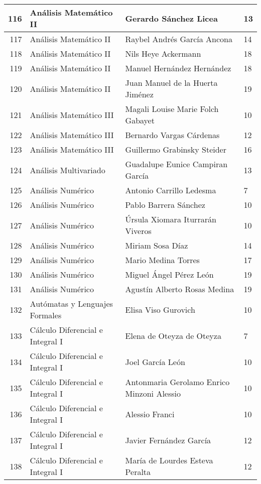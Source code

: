 \begin{table}[ht]
\begin{tabular}{rlll}
  116 & Análisis Matemático II & Gerardo Sánchez Licea & 13 \\ \hline
  117 & Análisis Matemático II & Raybel Andrés García Ancona & 14 \\ \hline
  118 & Análisis Matemático II & Nils Heye Ackermann & 18 \\ \hline
  119 & Análisis Matemático II & Manuel Hernández Hernández & 18 \\ \hline
  120 & Análisis Matemático II & Juan Manuel de la Huerta Jiménez & 19 \\ \hline
  121 & Análisis Matemático III & Magali Louise Marie Folch Gabayet & 10 \\ \hline
  122 & Análisis Matemático III & Bernardo Vargas Cárdenas & 12 \\ \hline
  123 & Análisis Matemático III & Guillermo Grabinsky Steider & 16 \\ \hline
  124 & Análisis Multivariado & Guadalupe Eunice Campiran García & 13 \\ \hline
  125 & Análisis Numérico & Antonio Carrillo Ledesma & 7 \\ \hline
  126 & Análisis Numérico & Pablo Barrera Sánchez & 10 \\ \hline
  127 & Análisis Numérico & Úrsula Xiomara Iturrarán Viveros & 10 \\ \hline
  128 & Análisis Numérico & Miriam Sosa Díaz & 14 \\ \hline
  129 & Análisis Numérico & Mario Medina Torres & 17 \\ \hline
  130 & Análisis Numérico & Miguel Ángel Pérez León & 19 \\ \hline
  131 & Análisis Numérico & Agustín Alberto Rosas Medina & 19 \\ \hline
  132 & Autómatas y Lenguajes Formales & Elisa Viso Gurovich & 10 \\ \hline
  133 & Cálculo Diferencial e Integral I & Elena de Oteyza de Oteyza & 7 \\ \hline
  134 & Cálculo Diferencial e Integral I & Joel García León & 10 \\ \hline
  135 & Cálculo Diferencial e Integral I & Antonmaria Gerolamo Enrico Minzoni Alessio & 10 \\ \hline
  136 & Cálculo Diferencial e Integral I & Alessio Franci & 10 \\ \hline
  137 & Cálculo Diferencial e Integral I & Javier Fernández García & 12 \\ \hline
  138 & Cálculo Diferencial e Integral I & María de Lourdes Esteva Peralta & 12 \\ \hline

\end{tabular}
\end{table}
